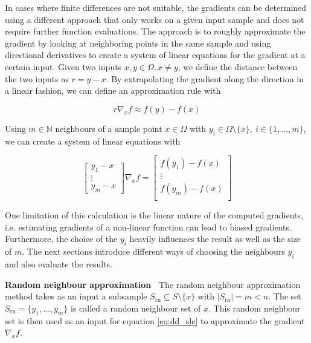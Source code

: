 \documentclass[
  a4paper,  %
  twoside,  %
  bibliography=totoc,
  headsepline,
  cleardoublepage=empty,
  parskip=half,
  draft=false
]{scrbook}
\begin{document}
In cases where finite differences are not suitable, the gradients can be determined using a different approach that only works on a given input sample and does not require further function evaluations.
The approach is to roughly approximate the gradient by looking at neighboring points in the same sample and using directional derivatives to create a system of linear equations for the gradient at a certain input.
Given two inputs $x, y \in \Omega, x \neq y$, we define the distance between the two inputs as $r=y-x$.
By extrapolating the gradient along the direction in a linear fashion, we can define an approximation rule with

\begin{equation}
r \nabla_x f \approx f(y) - f(x)
\end{equation}

Using $m \in \mathds{N}$ neighbours of a sample point $x \in \Omega$ with $y_i \in \Omega \setminus \{x\}, ~ i \in \{1, \dots, m\}$, we can create a system of linear equations with

\begin{equation}
\begin{bmatrix}
    y_1 - x\\
    \vdots \\
    y_m - x
  \end{bmatrix}  \nabla_x f =\begin{bmatrix}
    f(y_1) - f(x) \\ \vdots \\  f(y_m) - f(x)
    \\
  \end{bmatrix}
  \label{eq:dd_sle}
\end{equation}

One limitation of this calculation is the linear nature of the computed gradients, i.e. estimating gradients of a non-linear function can lead to biased gradients.
Furthermore, the choice of the $y_i$ heavily influences the result as well as the size of $m$.
The next sections introduce different ways of choosing the neighbours $y_i$ and also evaluate the results.

\vspace{2mm}
\textbf{Random neighbour approximation~} The random neighbour approximation method takes as an input a subsample $S_{\text{rn}} \subseteq S \setminus \{x\}$ with $|S_{\text{rn}}|=m < n$.
The set $S_{\text{rn}}=\{y_1, \dots, y_{m}\}$ is called a random neighbour set of $x$.
This random neighbour set is then used as an input for equation \cref{eq:dd_sle} to approximate the gradient $\nabla_x f$.
\end{document}

